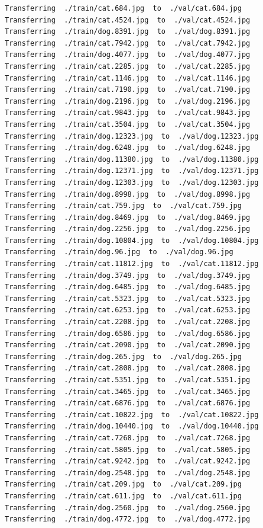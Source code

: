 \documentclass[]{book}
\theoremstyle{definition}
\theoremstyle{definition}
\theoremstyle{definition}
\theoremstyle{remark}
\begin{document}
\begin{verbatim}
Transferring  ./train/cat.684.jpg  to  ./val/cat.684.jpg
Transferring  ./train/cat.4524.jpg  to  ./val/cat.4524.jpg
Transferring  ./train/dog.8391.jpg  to  ./val/dog.8391.jpg
Transferring  ./train/cat.7942.jpg  to  ./val/cat.7942.jpg
Transferring  ./train/dog.4077.jpg  to  ./val/dog.4077.jpg
Transferring  ./train/cat.2285.jpg  to  ./val/cat.2285.jpg
Transferring  ./train/cat.1146.jpg  to  ./val/cat.1146.jpg
Transferring  ./train/cat.7190.jpg  to  ./val/cat.7190.jpg
Transferring  ./train/dog.2196.jpg  to  ./val/dog.2196.jpg
Transferring  ./train/cat.9843.jpg  to  ./val/cat.9843.jpg
Transferring  ./train/cat.3504.jpg  to  ./val/cat.3504.jpg
Transferring  ./train/dog.12323.jpg  to  ./val/dog.12323.jpg
Transferring  ./train/dog.6248.jpg  to  ./val/dog.6248.jpg
Transferring  ./train/dog.11380.jpg  to  ./val/dog.11380.jpg
Transferring  ./train/dog.12371.jpg  to  ./val/dog.12371.jpg
Transferring  ./train/dog.12303.jpg  to  ./val/dog.12303.jpg
Transferring  ./train/dog.8998.jpg  to  ./val/dog.8998.jpg
Transferring  ./train/cat.759.jpg  to  ./val/cat.759.jpg
Transferring  ./train/dog.8469.jpg  to  ./val/dog.8469.jpg
Transferring  ./train/dog.2256.jpg  to  ./val/dog.2256.jpg
Transferring  ./train/dog.10804.jpg  to  ./val/dog.10804.jpg
Transferring  ./train/dog.96.jpg  to  ./val/dog.96.jpg
Transferring  ./train/cat.11812.jpg  to  ./val/cat.11812.jpg
Transferring  ./train/dog.3749.jpg  to  ./val/dog.3749.jpg
Transferring  ./train/dog.6485.jpg  to  ./val/dog.6485.jpg
Transferring  ./train/cat.5323.jpg  to  ./val/cat.5323.jpg
Transferring  ./train/cat.6253.jpg  to  ./val/cat.6253.jpg
Transferring  ./train/cat.2208.jpg  to  ./val/cat.2208.jpg
Transferring  ./train/dog.6586.jpg  to  ./val/dog.6586.jpg
Transferring  ./train/cat.2090.jpg  to  ./val/cat.2090.jpg
Transferring  ./train/dog.265.jpg  to  ./val/dog.265.jpg
Transferring  ./train/cat.2808.jpg  to  ./val/cat.2808.jpg
Transferring  ./train/cat.5351.jpg  to  ./val/cat.5351.jpg
Transferring  ./train/cat.3465.jpg  to  ./val/cat.3465.jpg
Transferring  ./train/cat.6876.jpg  to  ./val/cat.6876.jpg
Transferring  ./train/cat.10822.jpg  to  ./val/cat.10822.jpg
Transferring  ./train/dog.10440.jpg  to  ./val/dog.10440.jpg
Transferring  ./train/cat.7268.jpg  to  ./val/cat.7268.jpg
Transferring  ./train/cat.5805.jpg  to  ./val/cat.5805.jpg
Transferring  ./train/cat.9242.jpg  to  ./val/cat.9242.jpg
Transferring  ./train/dog.2548.jpg  to  ./val/dog.2548.jpg
Transferring  ./train/cat.209.jpg  to  ./val/cat.209.jpg
Transferring  ./train/cat.611.jpg  to  ./val/cat.611.jpg
Transferring  ./train/dog.2560.jpg  to  ./val/dog.2560.jpg
Transferring  ./train/dog.4772.jpg  to  ./val/dog.4772.jpg

\end{verbatim}
\end{document}
